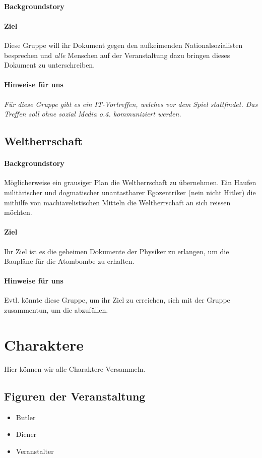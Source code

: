 \documentclass[12pt, a4paper, openany]{report}
\begin{document}
\subsubsection{Backgroundstory}
\subsubsection{Ziel}
Diese Gruppe will ihr Dokument gegen den aufkeimenden Nationalsozialisten besprechen und \emph{alle} Menschen auf der Veranstaltung dazu bringen dieses Dokument zu unterschreiben.

\subsubsection{Hinweise für uns}
\emph{Für diese Gruppe gibt es ein IT-Vortreffen, welches vor dem Spiel stattfindet.
Das Treffen soll ohne sozial Media o.ä. kommuniziert werden.}

\section{Weltherrschaft}
\subsubsection{Backgroundstory}
Möglicherweise ein grausiger Plan die Weltherrschaft zu übernehmen. 
Ein Haufen militärischer und dogmatischer unantastbarer Egozentriker (nein nicht Hitler) die mithilfe von machiavelistischen Mitteln die Weltherrschaft an sich reissen möchten. 

\subsubsection{Ziel}
Ihr Ziel ist es die geheimen Dokumente der Physiker zu erlangen, um die Baupläne für die Atombombe zu erhalten.

\subsubsection{Hinweise für uns}
Evtl. könnte diese Gruppe, um ihr Ziel zu erreichen, sich mit der Gruppe  zusammentun, um die abzufüllen.

\chapter{Charaktere}
Hier können wir alle Charaktere Versammeln.

\section{Figuren der Veranstaltung}
\begin{itemize}
   	 \item Butler
    	\item Diener
    	\item Veranstalter
\end{itemize}
\end{document}
